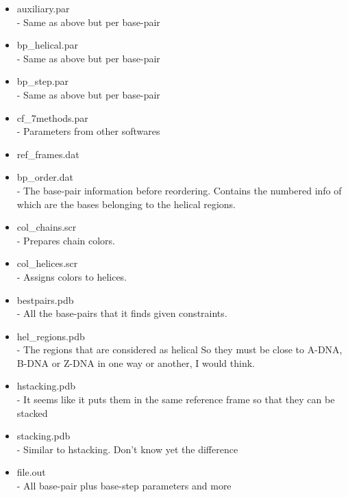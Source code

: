 \begin{itemize}
\item auxiliary.par\\   
                - Same as above but per base-pair
\item bp\_helical.par\\  
                - Same as above but per base-pair
\item bp\_step.par\\     
                - Same as above but per base-pair
\item cf\_7methods.par\\ 
                - Parameters from other softwares
\item ref\_frames.dat\\
\item bp\_order.dat\\    
                - The base-pair information before reordering.
                 Contains the numbered info of which are the 
		 bases belonging to the helical regions.
\item col\_chains.scr\\  
                - Prepares chain colors.
\item col\_helices.scr\\ 
                - Assigns colors to helices.
\item bestpairs.pdb\\   
                - All the base-pairs that it finds given constraints.
\item hel\_regions.pdb\\ 
                - The regions that are considered as helical
                  So they must be close to A-DNA, B-DNA or
		  Z-DNA in one way or another, I would think.
\item hstacking.pdb\\   
                - It seems like it puts them in the same reference
                 frame so that they can be stacked
\item stacking.pdb\\    
                - Similar to hstacking. Don't know yet the difference
\item file.out\\        
                - All base-pair plus base-step parameters and more
\end{itemize}
